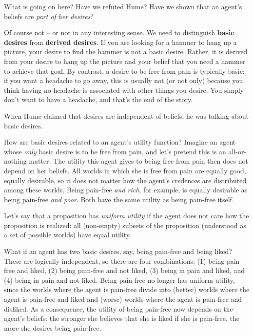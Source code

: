 What is going on here? Have we refuted Hume? Have we shown that an
agent's beliefs are \emph{part of her desires}? 

Of course not -- or not in any interesting sense. We need to
distinguish \textbf{basic desires} from \textbf{derived desires}. If
you are looking for a hammer to hang up a picture, your desire to find
the hammer is not a basic desire. Rather, it is derived from your
desire to hang up the picture and your belief that you need a hammer
to achieve that goal. By contrast, a desire to be free from pain is
typically basic: if you want a headache to go away, this is usually
not (or not only) because you think having no headache is associated
with other things you desire. You simply don't want to have a
headache, and that's the end of the story.

When Hume claimed that desires are independent of beliefs, he was
talking about basic desires.

How are basic desires related to an agent's utility function? Imagine
an agent whose \emph{only} basic desire is to be free from pain, and
let's pretend this is an all-or-nothing matter. The utility this agent
gives to being free from pain then does not depend on her beliefs. All
worlds in which she is free from pain are equally good, equally
desirable, so it does not matter how the agent's credences are
distributed among these worlds. Being pain-free \emph{and rich}, for
example, is equally desirable as being pain-free \emph{and poor}. Both
have the same utility as being pain-free itself.

Let's say that a proposition has \emph{uniform utility} if the agent
does not care how the proposition is realized: all (non-empty) subsets
of the proposition (understood as a set of possible worlds) have equal
utility. 

What if an agent has two basic desires, say, being pain-free and being
liked? These are logically independent, so there are four
combinations: (1) being pain-free and liked, (2) being pain-free and
not liked, (3) being in pain and liked, and (4) being in pain and not
liked. Being pain-free no longer has uniform utility, since the worlds
where the agent is pain-free divide into (better) worlds where the
agent is pain-free and liked and (worse) worlds where the agent is
pain-free and disliked. As a consequence, the utility of being
pain-free now depends on the agent's beliefs: the stronger she
believes that she is liked if she is pain-free, the more she desires
being pain-free.

